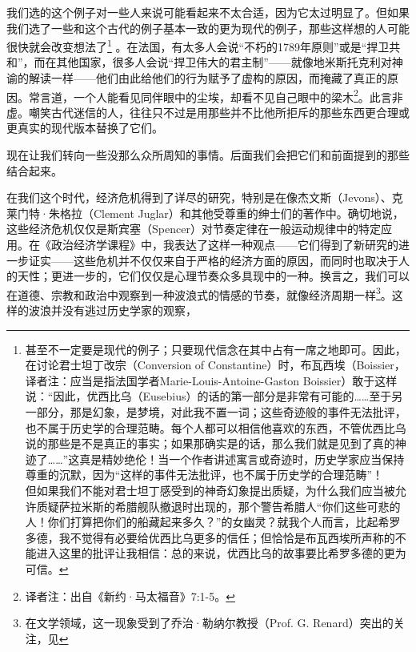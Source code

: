 我们选的这个例子对一些人来说可能看起来不太合适，因为它太过明显了。但如果我们选了一些和这个古代的例子基本一致的更为现代的例子，那些这样想的人可能很快就会改变想法了\footnote{甚至不一定要是现代的例子；只要现代信念在其中占有一席之地即可。因此，在讨论君士坦丁改宗（Conversion of Constantine）时，布瓦西埃（Boissier，译者注：应当是指法国学者Marie-Louis-Antoine-Gaston Boissier）敢于这样说：“因此，优西比乌（Eusebius）的话的第一部分是非常有可能的……至于另一部分，那是幻象，是梦境，对此我不置一词；这些奇迹般的事件无法批评，也不属于历史学的合理范畴。每个人都可以相信他喜欢的东西，不管优西比乌说的那些是不是真正的事实；如果那确实是的话，那么我们就是见到了真的神迹了……”\parencite[p.~39]{boissier_fin_1894}这真是精妙绝伦！当一个作者讲述寓言或奇迹时，历史学家应当保持尊重的沉默，因为“这样的事件无法批评，也不属于历史学的合理范畴”！\\
    \setlength{\parindent}{2em}
    \indent
    但如果我们不能对君士坦丁感受到的神奇幻象提出质疑，为什么我们应当被允许质疑萨拉米斯的希腊舰队撤退时出现的，那个警告希腊人“你们这些可悲的人！你们打算把你们的船藏起来多久？”的女幽灵？就我个人而言，比起希罗多德，我不觉得有必要给优西比乌更多的信任；但恰恰是布瓦西埃所声称的不能进入这里的批评让我相信：总的来说，优西比乌的故事要比希罗多德的更为可信。}
。在法国，有太多人会说“不朽的1789年原则”或是“捍卫共和”，而在其他国家，很多人会说“捍卫伟大的君主制”——就像地米斯托克利对神谕的解读一样——他们由此给他们的行为赋予了虚构的原因，而掩藏了真正的原因。常言道，一个人能看见同伴眼中的尘埃，却看不见自己眼中的梁木\footnote{译者注：出自《新约·马太福音》7:1-5。}。此言非虚。嘲笑古代迷信的人，往往只不过是用那些并不比他所拒斥的那些东西更合理或更真实的现代版本替换了它们。

现在让我们转向一些没那么众所周知的事情。后面我们会把它们和前面提到的那些结合起来。

在我们这个时代，经济危机得到了详尽的研究，特别是在像杰文斯（Jevons）、克莱门特·朱格拉（Clement Juglar）和其他受尊重的绅士们的著作中。确切地说，这些经济危机仅仅是斯宾塞（Spencer）对节奏定律在一般运动规律中的特定应用。在《政治经济学课程》中，我表达了这样一种观点——它们得到了新研究的进一步证实——这些危机并不仅仅来自于严格的经济方面的原因，而同时也取决于人的天性；更进一步的，它们仅仅是心理节奏众多具现中的一种。换言之，我们可以在道德、宗教和政治中观察到一种波浪式的情感的节奏，就像经济周期一样\footnote{在文学领域，这一现象受到了乔治·勒纳尔教授（Prof. G. Renard）突出的关注，见\textcite{renard_methode_1900}}。这样的波浪并没有逃过历史学家的观察，
